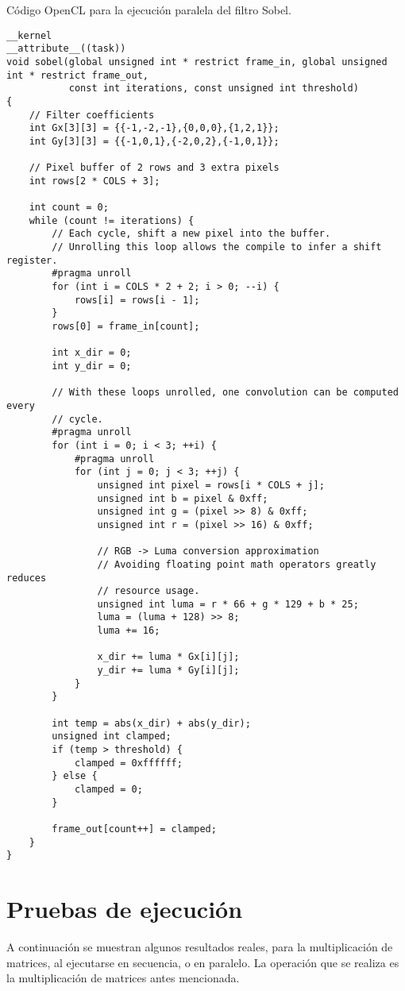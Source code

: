 \documentclass[12pt,a4paper]{article}
\begin{document}
Código OpenCL para la ejecución paralela del filtro Sobel.
\begin{lstlisting}
__kernel
__attribute__((task))
void sobel(global unsigned int * restrict frame_in, global unsigned int * restrict frame_out,
           const int iterations, const unsigned int threshold)
{
    // Filter coefficients
    int Gx[3][3] = {{-1,-2,-1},{0,0,0},{1,2,1}};
    int Gy[3][3] = {{-1,0,1},{-2,0,2},{-1,0,1}};

    // Pixel buffer of 2 rows and 3 extra pixels
    int rows[2 * COLS + 3];

    int count = 0;
    while (count != iterations) {
        // Each cycle, shift a new pixel into the buffer.
        // Unrolling this loop allows the compile to infer a shift register.
        #pragma unroll
        for (int i = COLS * 2 + 2; i > 0; --i) {
            rows[i] = rows[i - 1];
        }
        rows[0] = frame_in[count];

        int x_dir = 0;
        int y_dir = 0;

        // With these loops unrolled, one convolution can be computed every
        // cycle.
        #pragma unroll
        for (int i = 0; i < 3; ++i) {
            #pragma unroll
            for (int j = 0; j < 3; ++j) {
                unsigned int pixel = rows[i * COLS + j];
                unsigned int b = pixel & 0xff;
                unsigned int g = (pixel >> 8) & 0xff;
                unsigned int r = (pixel >> 16) & 0xff;

                // RGB -> Luma conversion approximation
                // Avoiding floating point math operators greatly reduces
                // resource usage.
                unsigned int luma = r * 66 + g * 129 + b * 25;
                luma = (luma + 128) >> 8;
                luma += 16;

                x_dir += luma * Gx[i][j];
                y_dir += luma * Gy[i][j];
            }
        }

        int temp = abs(x_dir) + abs(y_dir);
        unsigned int clamped;
        if (temp > threshold) {
            clamped = 0xffffff;
        } else {
            clamped = 0;
        }

        frame_out[count++] = clamped;
    }
}
\end{lstlisting}



\section{Pruebas de ejecución}
A continuación se muestran algunos resultados reales, para la multiplicación de 
matrices, al ejecutarse en secuencia, o en paralelo. La operación que se realiza 
es la multiplicación de matrices antes mencionada.
\end{document}

